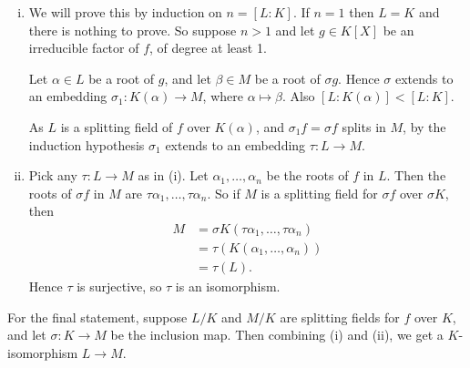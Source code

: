 \documentclass[12pt]{article}
\begin{document}
\begin{proofbox}
	\begin{enumerate}[(i)]
		\item We will prove this by induction on $n = [L:K]$. If $n = 1$ then $L = K$ and there is nothing to prove. So suppose $n > 1$ and let $g \in K[X]$ be an irreducible factor of $f$, of degree at least 1.

			Let $\alpha \in L$ be a root of $g$, and let $\beta \in M$ be a root of $\sigma g$. Hence $\sigma$ extends to an embedding $\sigma_1 : K(\alpha) \to M$, where $\alpha \mapsto \beta$. Also $[L:K(\alpha)] < [L:K]$.

			As $L$ is a splitting field of $f$ over $K(\alpha)$, and $\sigma_1 f = \sigma f$ splits in $M$, by the induction hypothesis $\sigma_1$ extends to an embedding $\tau : L \to M$.
		\item Pick any $\tau : L \to M$ as in (i). Let $\alpha_1, \ldots, \alpha_n$ be the roots of $f$ in $L$. Then the roots of $\sigma f$ in $M$ are $\tau \alpha_1, \ldots, \tau \alpha_n$. So if $M$ is a splitting field for $\sigma f$ over $\sigma K$, then
			\begin{align*}
				M &= \sigma K(\tau \alpha_1, \ldots, \tau \alpha_n) \\
				  &= \tau (K(\alpha_1, \ldots, \alpha_n)) \\
				  &= \tau(L).
			\end{align*}
			Hence $\tau$ is surjective, so $\tau$ is an isomorphism.
	\end{enumerate}
	For the final statement, suppose $L/K$ and $M/K$ are splitting fields for $f$ over $K$, and let $\sigma : K \to M$ be the inclusion map. Then combining (i) and (ii), we get a $K$-isomorphism $L \to M$.
\end{proofbox}
\end{document}
